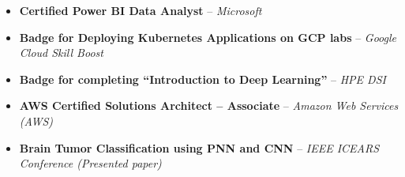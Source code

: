

\begin{itemize}[noitemsep, topsep=0.6pt, left=0pt]
    \item \textbf{Certified Power BI Data Analyst   } – \textit{   Microsoft}
    \item \textbf{Badge for Deploying Kubernetes Applications on GCP labs   } – \textit{   Google Cloud Skill Boost}
    \item \textbf{Badge for completing “Introduction to Deep Learning”   } – \textit{   HPE DSI}
    \item \textbf{AWS Certified Solutions Architect – Associate   } – \textit{   Amazon Web Services (AWS)}
    \item \textbf{Brain Tumor Classification using PNN and CNN   } – \textit{   IEEE ICEARS Conference (Presented paper)}
\end{itemize}